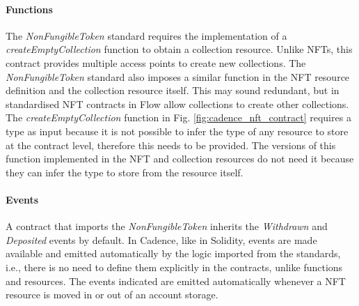 \documentclass[../NFTComp_IEEE.tex]{subfiles}
\begin{document}
\paragraph{Functions}
The \textit{NonFungibleToken} standard requires the implementation of a \textit{createEmptyCollection} function to obtain a collection resource. Unlike NFTs, this contract provides multiple access points to create new collections. The \textit{NonFungibleToken} standard also imposes a similar function in the NFT resource definition and the collection resource itself. This may sound redundant, but in standardised NFT contracts in Flow allow collections to create other collections. The \textit{createEmptyCollection} function in Fig. \ref{fig:cadence_nft_contract} requires a type as input because it is not possible to infer the type of any resource to store at the contract level, therefore this needs to be provided. The versions of this function implemented in the NFT and collection resources do not need it because they can infer the type to store from the resource itself.

\paragraph{Events}
A contract that imports the \textit{NonFungibleToken} inherits the \textit{Withdrawn} and \textit{Deposited} events by default. In Cadence, like in Solidity, events are made available and emitted automatically by the logic imported from the standards, i.e., there is no need to define them explicitly in the contracts, unlike functions and resources. The events indicated are emitted automatically whenever a NFT resource is moved in or out of an account storage.
\end{document}
